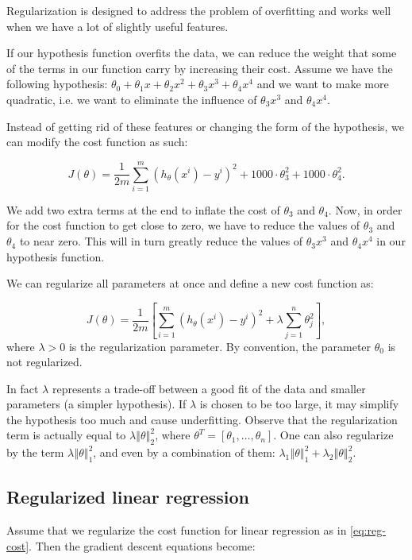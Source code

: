 \documentclass[a4paper,11pt]{report}
\newcommand{\norm}[1]{\left\Vert#1\right\Vert}
\newcommand{\ds}{\displaystyle}
\begin{document}
Regularization is designed to address the problem of overfitting and works well when we have a lot of slightly useful features.

If our hypothesis function overfits the data, we can reduce the weight that some of the terms in our function carry by increasing their cost. Assume we have the following hypothesis:
$\theta_0 + \theta_1x + \theta_2x^2 + \theta_3x^3 + \theta_4x^4$ and we want to make more quadratic, i.e. we want to eliminate the influence of $\theta_3x^3$ and $\theta_4x^4$.

Instead of getting rid of these features or changing the form of the hypothesis, we can modify the cost function as such:

$$J(\theta) = \ds \dfrac{1}{2m}\sum_{i=1}^m (h_\theta(x^i) - y^{i})^2 + 1000\cdot\theta_3^2 + 1000\cdot\theta_4^2.$$

We add two extra terms at the end to inflate the cost of $\theta_3$ and $\theta_4$. Now, in order for the cost function to get close to zero, we have to reduce the values of $\theta_3$ and $\theta_4$ to near zero. This will in turn greatly reduce the values of $\theta_3x^3$ and $\theta_4x^4$ in our hypothesis function.

We can regularize all parameters at once and define a new cost function as:

\begin{equation}\label{eq:reg-cost}
J(\theta) = \ds \dfrac{1}{2m} \left[ \sum_{i=1}^m (h_\theta(x^{i}) - y^{i})^2 + \lambda \sum_{j=1}^n \theta_j^2 \right],
\end{equation}
where $\lambda > 0$ is the regularization parameter. By convention, the parameter $\theta_0$ is not regularized.

In fact $\lambda$ represents a trade-off between a good fit of the data and smaller parameters (a simpler hypothesis). If $\lambda$ is chosen to be too large, it may simplify the hypothesis too much and cause underfitting. Observe that the regularization term is actually equal to $\lambda \norm{\theta}_2^2$, where $\theta^T = [\theta_1, \ldots, \theta_n]$. One can also regularize by the term $\lambda \norm{\theta}_1^2$, and even by a combination of them: $\lambda_1 \norm{\theta}_1^2 + \lambda_2 \norm{\theta}_2^2$.

\subsection*{Regularized linear regression}

Assume that we regularize the cost function for linear regression as in \eqref{eq:reg-cost}. Then the gradient descent equations become:
\end{document}
